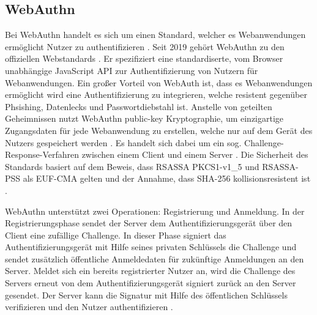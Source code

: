 \subsection{WebAuthn}
Bei WebAuthn handelt es sich um einen Standard, welcher es Webanwendungen ermöglicht Nutzer zu authentifizieren \cite{lyastani2020fido2}. Seit 2019 gehört WebAuthn zu den offiziellen Webstandards \cite{farke2020you}. Er spezifiziert eine standardiserte, vom Browser unabhängige JavaScript \ac{API} zur Authentifizierung von Nutzern für Webanwendungen. Ein großer Vorteil von WebAuth ist, dass es Webanwendungen ermöglicht wird eine Authentifizierung zu integrieren, welche resistent gegenüber Phsishing, Datenlecks und Passwortdiebstahl ist. Anstelle von geteilten Geheimnissen nutzt WebAuthn public-key Kryptographie, um einzigartige Zugangsdaten für jede Webanwendung zu erstellen, welche nur auf dem Gerät des Nutzers gespeichert werden \cite{farke2020you}. Es handelt sich dabei um ein sog. Challenge-Response-Verfahren zwischen einem Client und einem Server \cite{barbosa2021provable}. Die Sicherheit des Standards basiert auf dem Beweis, dass RSASSA PKCS1-v1\_5 und RSASSA-PSS als \ac{EUF-CMA} gelten und der Annahme, dass SHA-256 kollisionsresistent ist \cite{barbosa2021provable}.

WebAuthn unterstützt zwei Operationen: Registrierung und Anmeldung. In der Registrierungsphase sendet der Server dem Authentifizierungsgerät über den Client eine zufällige Challenge. In dieser Phase signiert das Authentifizierungsgerät mit Hilfe seines privaten Schlüssels die Challenge und sendet zusätzlich öffentliche Anmeldedaten für zukünftige Anmeldungen an den Server. Meldet sich ein bereits registrierter Nutzer an, wird die Challenge des Servers erneut von dem Authentifizierungsgerät signiert zurück an den Server gesendet. Der Server kann die Signatur mit Hilfe des öffentlichen Schlüssels verifizieren und den Nutzer authentifizieren \cite{barbosa2021provable}.


